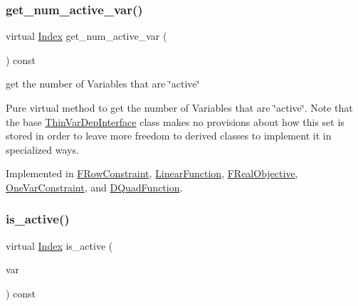 \subsubsection{\texorpdfstring{get\+\_\+num\+\_\+active\+\_\+var()}{get\_num\_active\_var()}}
{\footnotesize\ttfamily virtual \mbox{\hyperlink{group___thin_var_dep_interface___c_l_a_s_s_e_s_gad53d6229d7ec28555a9c9c2fd9abf773}{Index}} get\+\_\+num\+\_\+active\+\_\+var (\begin{DoxyParamCaption}\item[{void}]{ }\end{DoxyParamCaption}) const\hspace{0.3cm}{\ttfamily [pure virtual]}}



get the number of Variables that are \char`\"{}active\char`\"{} 

Pure virtual method to get the number of Variables that are \char`\"{}active\char`\"{}. Note that the base \mbox{\hyperlink{class_s_m_spp__di__unipi__it_1_1_thin_var_dep_interface}{Thin\+Var\+Dep\+Interface}} class makes no provisions about how this set is stored in order to leave more freedom to derived classes to implement it in specialized ways. 

Implemented in \mbox{\hyperlink{class_s_m_spp__di__unipi__it_1_1_f_row_constraint_acc8ac3c57cc2c71ac3fe6c409fe53074}{F\+Row\+Constraint}}, \mbox{\hyperlink{class_s_m_spp__di__unipi__it_1_1_linear_function_a9e4e36559af1c5c8ecac72598b9fea4c}{Linear\+Function}}, \mbox{\hyperlink{class_s_m_spp__di__unipi__it_1_1_f_real_objective_acc8ac3c57cc2c71ac3fe6c409fe53074}{F\+Real\+Objective}}, \mbox{\hyperlink{class_s_m_spp__di__unipi__it_1_1_one_var_constraint_acc8ac3c57cc2c71ac3fe6c409fe53074}{One\+Var\+Constraint}}, and \mbox{\hyperlink{class_s_m_spp__di__unipi__it_1_1_d_quad_function_af7f92d9890df5e47c25215b99f97caef}{D\+Quad\+Function}}.

\mbox{\label{group___thin_var_dep_interface___c_l_a_s_s_e_s_ga05297a4e506f89ec692a01aca971ce2d}} 
\subsubsection{\texorpdfstring{is\+\_\+active()}{is\_active()}}
{\footnotesize\ttfamily virtual \mbox{\hyperlink{group___thin_var_dep_interface___c_l_a_s_s_e_s_gad53d6229d7ec28555a9c9c2fd9abf773}{Index}} is\+\_\+active (\begin{DoxyParamCaption}\item[{const \mbox{\hyperlink{class_s_m_spp__di__unipi__it_1_1_variable}{Variable}} $\ast$const}]{var }\end{DoxyParamCaption}) const\hspace{0.3cm}{\ttfamily [pure virtual]}}




